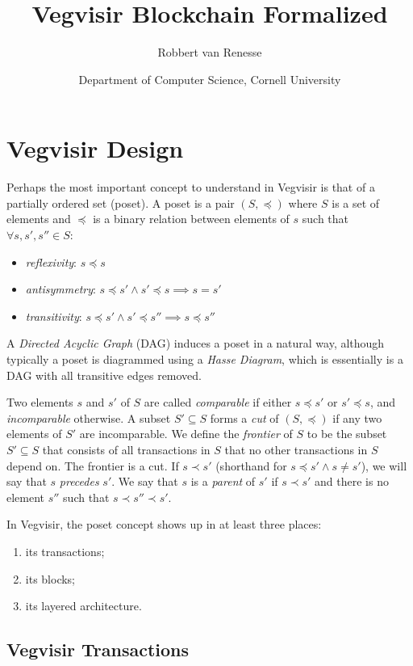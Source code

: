 \documentclass{article}
\title{Vegvisir Blockchain Formalized}
\author{Robbert van Renesse}
\date{Department of Computer Science, Cornell University}
\begin{document}
\maketitle

\section{Vegvisir Design}

Perhaps the most important concept to understand in Vegvisir is that of a partially ordered set (poset).
A poset is a pair $(S, \preceq)$ where $S$ is a set of elements and $\preceq$
is a binary relation between elements of $s$ such that
$\forall s, s', s'' \in S$:
\begin{itemize}
\item \emph{reflexivity}: $s \preceq s$
\item \emph{antisymmetry}: $s \preceq s' \wedge s' \preceq s \implies s = s'$
\item \emph{transitivity}: $s \preceq s' \wedge s' \preceq s'' \implies s \preceq s''$
\end{itemize}

A \emph{Directed Acyclic Graph} (DAG) induces a poset in a natural way,
although typically a poset is diagrammed using a \emph{Hasse Diagram},
which is essentially is a DAG with all transitive edges removed.

Two elements $s$ and $s'$ of $S$ are called \emph{comparable} if either
$s \preceq s'$ or $s' \preceq s$, and \emph{incomparable} otherwise.
A subset $S' \subseteq S$ forms a \emph{cut} of $(S, \preceq)$ if
any two elements of $S'$ are incomparable.
We define the \emph{frontier} of $S$ to be the subset $S' \subseteq S$ that
consists of all transactions in $S$ that no other transactions in $S$ depend
on.  The frontier is a cut.
If $s \prec s'$ (shorthand for $s \preceq s' \wedge s \neq s'$),
we will say that $s$ \emph{precedes} $s'$.
We say that $s$ is a \emph{parent} of $s'$ if $s \prec s'$ and
there is no element $s''$ such that $s \prec s'' \prec s'$.

In Vegvisir, the poset concept shows up in at least three places:
\begin{enumerate}
\item its transactions;
\item its blocks;
\item its layered architecture.
\end{enumerate}

\subsection{Vegvisir Transactions}
\end{document}
